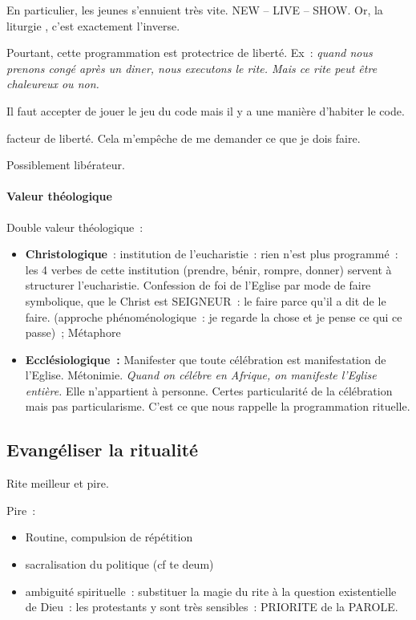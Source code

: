 En particulier, les jeunes s'ennuient très vite. NEW -- LIVE -- SHOW.
Or, la liturgie , c'est exactement l'inverse.

Pourtant, cette programmation est protectrice de liberté. Ex~:
\emph{quand nous prenons congé après un diner, nous executons le rite.
Mais ce rite peut être chaleureux ou non.}

Il faut accepter de jouer le jeu du code mais il y a une manière
d'habiter le code.

facteur de liberté. Cela m'empêche de me demander ce que je dois faire.

Possiblement libérateur.

\hypertarget{valeur-thuxe9ologique}{%
\paragraph{Valeur théologique}\label{valeur-thuxe9ologique}}

Double valeur théologique~:

\begin{itemize}
\item
  \textbf{Christologique}~: institution de l'eucharistie~: rien n'est
  plus programmé~: les 4 verbes de cette institution (prendre, bénir,
  rompre, donner) servent à structurer l'eucharistie. Confession de foi
  de l'Eglise par mode de faire symbolique, que le Christ est SEIGNEUR~:
  le faire parce qu'il a dit de le faire. (approche phénoménologique~:
  je regarde la chose et je pense ce qui ce passe)~;
  Métaphore
\item
  \textbf{Ecclésiologique~:} Manifester que toute célébration est
  manifestation de l'Eglise. Métonimie.
  \emph{Quand on célébre en Afrique, on manifeste l'Eglise entière.}
  Elle n'appartient à personne. Certes particularité de la célébration
  mais pas particularisme. C'est ce que nous rappelle la programmation
  rituelle.
\end{itemize}

\hypertarget{evanguxe9liser-la-ritualituxe9}{%
\subsection{Evangéliser la
ritualité}\label{evanguxe9liser-la-ritualituxe9}}

Rite meilleur et pire.

Pire~:

\begin{itemize}
\item
  Routine, compulsion de répétition
\item
  sacralisation du politique (cf te deum)
\item
  ambiguité spirituelle~: substituer la magie du rite à la question
  existentielle de Dieu~: les protestants y sont très sensibles~:
  PRIORITE de la PAROLE.
\end{itemize}

